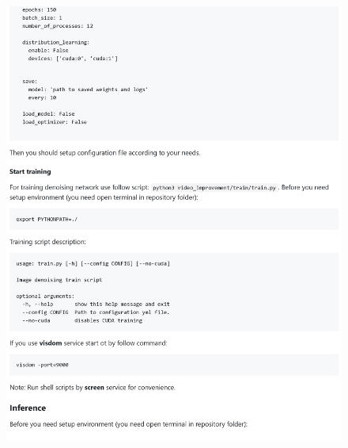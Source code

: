 \begin{appendices}
\begin{figure}[h]
	\centering
	\includegraphics[width=\textwidth]{img/markdown/README_3}
	\label{fig:markdown_3}
\end{figure}


\end{appendices}
